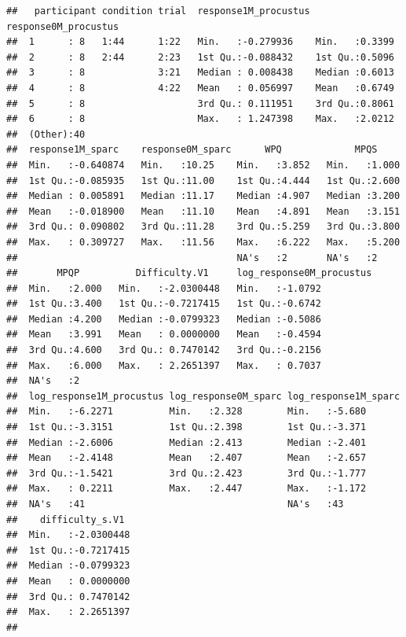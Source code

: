 \documentclass[
]{article}
\begin{document}
\begin{verbatim}
##   participant condition trial  response1M_procustus response0M_procustus
##  1      : 8   1:44      1:22   Min.   :-0.279936    Min.   :0.3399      
##  2      : 8   2:44      2:23   1st Qu.:-0.088432    1st Qu.:0.5096      
##  3      : 8             3:21   Median : 0.008438    Median :0.6013      
##  4      : 8             4:22   Mean   : 0.056997    Mean   :0.6749      
##  5      : 8                    3rd Qu.: 0.111951    3rd Qu.:0.8061      
##  6      : 8                    Max.   : 1.247398    Max.   :2.0212      
##  (Other):40                                                             
##  response1M_sparc    response0M_sparc      WPQ             MPQS      
##  Min.   :-0.640874   Min.   :10.25    Min.   :3.852   Min.   :1.000  
##  1st Qu.:-0.085935   1st Qu.:11.00    1st Qu.:4.444   1st Qu.:2.600  
##  Median : 0.005891   Median :11.17    Median :4.907   Median :3.200  
##  Mean   :-0.018900   Mean   :11.10    Mean   :4.891   Mean   :3.151  
##  3rd Qu.: 0.090802   3rd Qu.:11.28    3rd Qu.:5.259   3rd Qu.:3.800  
##  Max.   : 0.309727   Max.   :11.56    Max.   :6.222   Max.   :5.200  
##                                       NA's   :2       NA's   :2      
##       MPQP          Difficulty.V1     log_response0M_procustus
##  Min.   :2.000   Min.   :-2.0300448   Min.   :-1.0792         
##  1st Qu.:3.400   1st Qu.:-0.7217415   1st Qu.:-0.6742         
##  Median :4.200   Median :-0.0799323   Median :-0.5086         
##  Mean   :3.991   Mean   : 0.0000000   Mean   :-0.4594         
##  3rd Qu.:4.600   3rd Qu.: 0.7470142   3rd Qu.:-0.2156         
##  Max.   :6.000   Max.   : 2.2651397   Max.   : 0.7037         
##  NA's   :2                                                    
##  log_response1M_procustus log_response0M_sparc log_response1M_sparc
##  Min.   :-6.2271          Min.   :2.328        Min.   :-5.680      
##  1st Qu.:-3.3151          1st Qu.:2.398        1st Qu.:-3.371      
##  Median :-2.6006          Median :2.413        Median :-2.401      
##  Mean   :-2.4148          Mean   :2.407        Mean   :-2.657      
##  3rd Qu.:-1.5421          3rd Qu.:2.423        3rd Qu.:-1.777      
##  Max.   : 0.2211          Max.   :2.447        Max.   :-1.172      
##  NA's   :41                                    NA's   :43          
##    difficulty_s.V1   
##  Min.   :-2.0300448  
##  1st Qu.:-0.7217415  
##  Median :-0.0799323  
##  Mean   : 0.0000000  
##  3rd Qu.: 0.7470142  
##  Max.   : 2.2651397  
## 
\end{verbatim}
\end{document}
